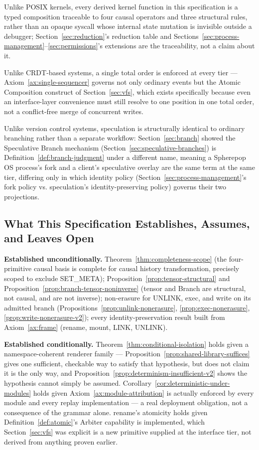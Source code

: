 \documentclass[11pt]{article}
\begin{document}
Unlike POSIX kernels, every derived kernel function in this specification is a typed composition traceable to four causal operators and three structural rules, rather than an opaque syscall whose internal state mutation is invisible outside a debugger; Section~\ref{sec:reduction}'s reduction table and Sections~\ref{sec:process-management}--\ref{sec:permissions}'s extensions are the traceability, not a claim about it.

Unlike CRDT-based systems, a single total order is enforced at every tier --- Axiom~\ref{ax:single-sequencer} governs not only ordinary events but the Atomic Composition construct of Section~\ref{sec:vfs}, which exists specifically because even an interface-layer convenience must still resolve to one position in one total order, not a conflict-free merge of concurrent writes.

Unlike version control systems, speculation is structurally identical to ordinary branching rather than a separate workflow: Section~\ref{sec:branch} showed the Speculative Branch mechanism (Section~\ref{sec:speculative-branches}) is Definition~\ref{def:branch-judgment} under a different name, meaning a Spherepop OS process's fork and a client's speculative overlay are the same term at the same tier, differing only in which identity policy (Section~\ref{sec:process-management}'s fork policy vs. speculation's identity-preserving policy) governs their two projections.

\subsection{What This Specification Establishes, Assumes, and Leaves Open}

\textbf{Established unconditionally.} Theorem~\ref{thm:completeness-scope} (the four-primitive causal basis is complete for causal history transformation, precisely scoped to exclude SET\_META); Proposition~\ref{prop:tensor-structural} and Proposition~\ref{prop:branch-tensor-noninverse} (tensor and Branch are structural, not causal, and are not inverse); non-erasure for UNLINK, exec, and write on its admitted branch (Propositions~\ref{prop:unlink-nonerasure}, \ref{prop:exec-nonerasure}, \ref{prop:write-nonerasure-v2}); every identity-preservation result built from Axiom~\ref{ax:frame} (rename, mount, LINK, UNLINK).

\textbf{Established conditionally.} Theorem~\ref{thm:conditional-isolation} holds given a namespace-coherent renderer family --- Proposition~\ref{prop:shared-library-suffices} gives one sufficient, checkable way to satisfy that hypothesis, but does not claim it is the only way, and Proposition~\ref{prop:determinism-insufficient-v2} shows the hypothesis cannot simply be assumed. Corollary~\ref{cor:deterministic-under-modules} holds given Axiom~\ref{ax:module-attribution} is actually enforced by every module and every replay implementation --- a real deployment obligation, not a consequence of the grammar alone. rename's atomicity holds given Definition~\ref{def:atomic}'s Arbiter capability is implemented, which Section~\ref{sec:vfs} was explicit is a new primitive supplied at the interface tier, not derived from anything proven earlier.
\end{document}
